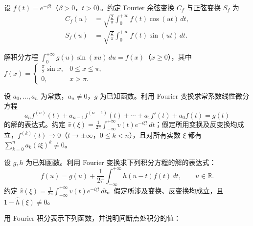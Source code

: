 \noindent\begin{minipage}{\textwidth}
设 $f(t)=e^{-\beta t}$（$\beta>0$，$t>0$）。约定 Fourier 余弦变换 $C_f$ 与正弦变换 $S_f$ 为\[\begin{aligned}C_f(u)&=\sqrt{\frac2\pi}\int_0^{+\infty}f(t)\cos(ut)\,dt,\\S_f(u)&=\sqrt{\frac2\pi}\int_0^{+\infty}f(t)\sin(ut)\,dt.\end{aligned}\]
\end{minipage}\par\vfill
\noindent\begin{minipage}{\textwidth}
解积分方程 $\displaystyle\int_0^{+\infty}g(u)\sin(xu)\,du=f(x)$（$x\ge0$），其中 $\displaystyle f(x)=\begin{cases}\frac\pi2\sin x,&0\le x\le\pi,\\0,&x>\pi.\end{cases}$
\end{minipage}\par\vfill
\newpage
\noindent\begin{minipage}{\textwidth}
设 $a_0,\ldots,a_n$ 为常数，$a_n\ne0$，$g$ 为已知函数。利用 Fourier 变换求常系数线性微分方程\[a_nf^{(n)}(t)+a_{n-1}f^{(n-1)}(t)+\cdots+a_1f'(t)+a_0f(t)=g(t)\]的解的表达式。约定 $\displaystyle\widehat v(\xi)=\frac1{2\pi}\int_{-\infty}^{+\infty}v(t)e^{-i\xi t}\,dt$；假定所用变换及反变换均成立，$f^{(k)}(t)\to0$（$t\to\pm\infty$，$0\le k<n$），且对所有实数 $\xi$ 都有 $\sum_{k=0}^n a_k(i\xi)^k\ne0$。
\end{minipage}\par\vfill
\noindent\begin{minipage}{\textwidth}
设 $g,h$ 为已知函数。利用 Fourier 变换求下列积分方程的解的表达式：\[f(u)=g(u)+\frac1{2\pi}\int_{-\infty}^{+\infty}h(u-t)f(t)\,dt,\qquad u\in\mathbb R.\]约定 $\displaystyle\widehat v(\xi)=\frac1{2\pi}\int_{-\infty}^{+\infty}v(t)e^{-i\xi t}\,dt$。假定所涉及变换、反变换均成立，且 $1-\widehat h(\xi)\ne0$。
\end{minipage}\par\vfill
\noindent\begin{minipage}{\textwidth}
用 Fourier 积分表示下列函数，并说明间断点处积分的值：
\end{minipage}\par\vfill
